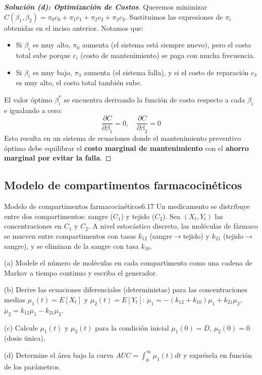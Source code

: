 \documentclass[10pt,a4paper]{article}
\begin{document}
\vspace{5mm}

\begin{proof}[\textbf{Solución (d): Optimización de Costos}]
    Queremos minimizar $C(\beta_1, \beta_2) = \pi_0 c_0 + \pi_1 c_1 + \pi_2 c_2 + \pi_3 c_3$.
    Sustituimos las expresiones de $\pi_i$ obtenidas en el inciso anterior. Notamos que:
    \begin{itemize}
        \item Si $\beta_i$ es muy alto, $\pi_0$ aumenta (el sistema está siempre nuevo), pero el costo total sube porque $c_i$ (costo de mantenimiento) se paga con mucha frecuencia.
        \item Si $\beta_i$ es muy bajo, $\pi_3$ aumenta (el sistema falla), y si el costo de reparación $c_3$ es muy alto, el costo total también sube.
    \end{itemize}
    
    El valor óptimo $\beta_i^*$ se encuentra derivando la función de costo respecto a cada $\beta_i$ e igualando a cero:
    \[ \frac{\partial C}{\partial \beta_1} = 0, \quad \frac{\partial C}{\partial \beta_2} = 0 \]
    Esto resulta en un sistema de ecuaciones donde el mantenimiento preventivo óptimo debe equilibrar el \textbf{costo marginal de mantenimiento} con el \textbf{ahorro marginal por evitar la falla}.
\end{proof}

\newpage

\subsection{Modelo de compartimentos farmacocinéticos}


\vspace{5mm}

\begin{ejercicio}{Modelo de compartimentos farmacocinéticos}{6.17}
    Un medicamento se distribuye entre dos compartimentos: sangre ($C_1$) y tejido ($C_2$). Sea $(X_t, Y_t)$ las concentraciones en $C_1$ y $C_2$. A nivel estocástico discreto, las moléculas de fármaco se mueven entre compartimentos con tasas $k_{12}$ (sangre$\to$tejido) y $k_{21}$ (tejido$\to$sangre), y se eliminan de la sangre con tasa $k_{10}$.
    
    (a) Modele el número de moléculas en cada compartimento como una cadena de Markov a tiempo continuo y escriba el generador.
    
    (b) Derive las ecuaciones diferenciales (deterministas) para las concentraciones medias $\mu_1(t) = E[X_t]$ y $\mu_2(t) = E[Y_t]$: $\dot{\mu}_1 = -(k_{12} + k_{10})\mu_1 + k_{21}\mu_2$, $\dot{\mu}_2 = k_{12}\mu_1 - k_{21}\mu_2$.
    
    (c) Calcule $\mu_1(t)$ y $\mu_2(t)$ para la condición inicial $\mu_1(0) = D$, $\mu_2(0) = 0$ (dosis única).
    
    (d) Determine el área bajo la curva $AUC = \int_{0}^{\infty} \mu_1(t) dt$ y exprésela en función de los parámetros.
\end{ejercicio}
\end{document}
